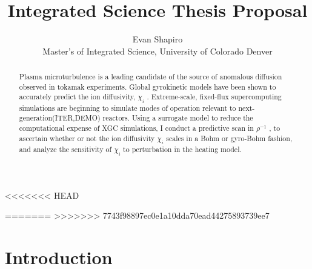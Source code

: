 \documentclass{article}
\title{Integrated Science Thesis Proposal}
\author{Evan Shapiro \\ Master's of Integrated Science, University of Colorado Denver}
\begin{document}
<<<<<<< HEAD


=======
>>>>>>> 7743f98897ec0e1a10dda70ead44275893739ee7

\begin{abstract}
Plasma microturbulence is a leading candidate of the source
of anomalous diffusion observed in %
tokamak experiments. Global gyrokinetic
models have been shown to accurately predict the ion diffusivity, $\chi_i$
. Extreme-scale, fixed-flux supercomputing simulations are beginning
to simulate modes of operation relevant to next-generation(ITER,DEMO)
reactors. Using a surrogate model to reduce the computational expense of XGC simulations, I conduct a predictive scan
in $\rho^{-1}$ , to ascertain
whether or not the ion diffusivity $\chi_i$ scales in a Bohm or gyro-Bohm
fashion, and analyze the sensitivity of $\chi_i$ to perturbation in the heating
model.%
\end{abstract}

\maketitle
\tableofcontents

\maketitle
\tableofcontents


\section{Introduction}
\end{document}
